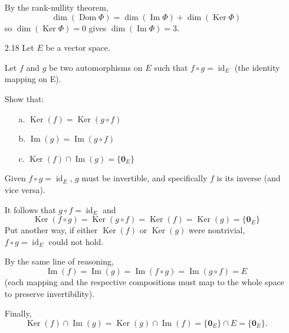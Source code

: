\documentclass[11pt]{article}
\DeclareMathOperator{\Ker}{Ker}
\DeclareMathOperator{\Img}{Im}
\DeclareMathOperator{\Dom}{Dom}
\DeclareMathOperator{\id}{id}
\theoremstyle{definition}
\theoremstyle{plain}
\theoremstyle{remark}
\begin{document}
\begin{enumerate}
          By the rank-nullity theorem,
          \[
              \dim(\Dom \Phi) = \dim(\Img \Phi) + \dim(\Ker \Phi)
          \]
          so \(\dim(\Ker \Phi) = 0\) gives \(\dim(\Img \Phi) = 3\).

          \pagebreak

    \item[2.18] Let \(E\) be a vector space.

          Let \(f\) and \(g\) be two automorphisms on \(E\) such that \(f \circ g = \id_E\) (the identity mapping on E).

          Show that:
          \begin{enumerate}
              \item[a.] \(\Ker(f) = \Ker(g \circ f)\)
              \item[b.] \(\Img(g) = \Img(g \circ f)\)
              \item[c.] \(\Ker(f) \cap \Img(g) = \{ \mathbf{0}_E \}\)
          \end{enumerate}

          Given \(f \circ g = \id_E\), \(g\) must be invertible, and specifically \(f\) is its inverse (and vice versa).

          It follows that \(g \circ f = \id_E\) and
          \[
              \Ker(f \circ g) = \Ker(g \circ f) = \Ker(f) = \Ker(g) = \{ \mathbf{0}_E \}
          \]
          Put another way, if either \(\Ker(f)\) or \(\Ker(g)\) were nontrivial, \(f \circ g = \id_E\) could not hold.

          By the same line of reasoning,
          \[
              \Img(f) = \Img(g) = \Img(f \circ g) = \Img(g \circ f) = E
          \]
          (each mapping and the respective compositions must map to the whole space to preserve invertibility).

          Finally,
          \[
              \Ker(f) \cap \Img(g) = \Ker(g) \cap \Img(f) = \{ \mathbf{0}_E \} \cap E = \{ \mathbf{0}_E \}.
          \]

\end{enumerate}
\end{document}
